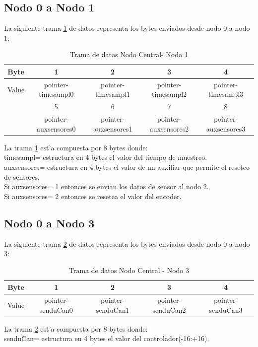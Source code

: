 \subsection{Nodo 0 a Nodo 1}
La siguiente trama \ref{tabla:ncn1} de datos representa los bytes enviados desde nodo 0 a nodo 1:
\begin{table}[htbp]
\begin{center}
\begin{tabular}{c c c c c}
\hline
Byte&1&2&3&4\\
\hline
Value & pointer-timesampl0 & pointer-timesampl1 & pointer-timesampl2 & pointer-timesampl3\\
\hline
&5&6&7&8\\
\hline
& pointer-auxsensores0 &  pointer-auxsensores1 & pointer-auxsensores2 & pointer-auxsensores3\\
\hline 
\end{tabular}
\caption{Trama de datos Nodo Central- Nodo 1}
\label{tabla:ncn1}
\end{center}
\end{table}
La trama \ref{tabla:ncn1} est'a compuesta por 8 bytes donde:\\
 timesampl= estructura en 4 bytes el valor del tiempo de muestreo.\\
					auxsensores= estructura en 4 bytes el valor de un auxiliar que permite el reseteo de sensores.\\
					Si auxsensores= 1 entonces se envian los datos de sensor al nodo 2.\\
					Si auxsensores= 2 entonces se resetea el valor del encoder.\\
					
\subsection{Nodo 0 a Nodo 3}
La siguiente trama \ref{tabla:ncn3} de datos representa los bytes enviados desde nodo 0 a nodo 3:
\begin{table}[htbp]
\begin{center}
\begin{tabular}{c c c c c}
\hline
Byte&1&2&3&4\\
\hline
Value & pointer-senduCan0 & pointer-senduCan1 & pointer-senduCan2 & pointer-senduCan3\\
\hline
\end{tabular}
\caption{Trama de datos Nodo Central - Nodo 3}
\label{tabla:ncn3}
\end{center}
\end{table}
La trama \ref{tabla:ncn3} est'a compuesta por 8 bytes donde:\\
senduCan= estructura en 4 bytes el valor del controlador(-16:+16).\\
							
